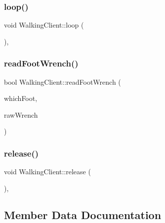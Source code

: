 \subsubsection{\texorpdfstring{loop()}{loop()}}
{\footnotesize\ttfamily void Walking\+Client\+::loop (\begin{DoxyParamCaption}{ }\end{DoxyParamCaption})\hspace{0.3cm}{\ttfamily [protected]}, {\ttfamily [virtual]}}

\hypertarget{classWalkingClient_a03ea2313c954a97aeb4d5b614f3e6caa}{}\label{classWalkingClient_a03ea2313c954a97aeb4d5b614f3e6caa} 
\subsubsection{\texorpdfstring{read\+Foot\+Wrench()}{readFootWrench()}}
{\footnotesize\ttfamily bool Walking\+Client\+::read\+Foot\+Wrench (\begin{DoxyParamCaption}\item[{\hyperlink{ZmpController_8h_a4b6a8e135f90bd56e5a57a60efb42529}{F\+O\+OT}}]{which\+Foot,  }\item[{Eigen\+::\+Vector\+Xd \&}]{raw\+Wrench }\end{DoxyParamCaption})}

\hypertarget{classWalkingClient_a3b36da9d7649865a13c9318dd73ebc7e}{}\label{classWalkingClient_a3b36da9d7649865a13c9318dd73ebc7e} 
\subsubsection{\texorpdfstring{release()}{release()}}
{\footnotesize\ttfamily void Walking\+Client\+::release (\begin{DoxyParamCaption}{ }\end{DoxyParamCaption})\hspace{0.3cm}{\ttfamily [protected]}, {\ttfamily [virtual]}}



\subsection{Member Data Documentation}
\hypertarget{classWalkingClient_afc6a0ac97a4c3f83e27879e803fab8f6}{}\label{classWalkingClient_afc6a0ac97a4c3f83e27879e803fab8f6} 
